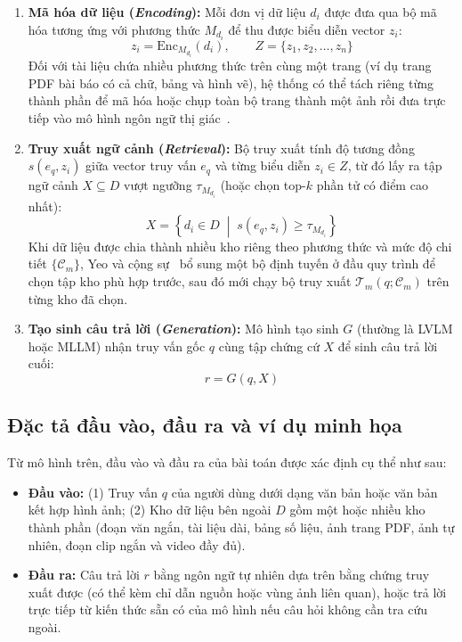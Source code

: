 \begin{enumerate}
    \item \textbf{Mã hóa dữ liệu (\textit{Encoding}):} Mỗi đơn vị dữ liệu $d_i$ được đưa qua bộ mã hóa tương ứng với phương thức $M_{d_i}$ để thu được biểu diễn vector $z_i$:
    \begin{equation}
        z_i = \mathrm{Enc}_{M_{d_i}}(d_i), \qquad Z = \{z_1, z_2, \dots, z_n\}
        \label{eq:ch1_encode}
    \end{equation}
    Đối với tài liệu chứa nhiều phương thức trên cùng một trang (ví dụ trang PDF bài báo có cả chữ, bảng và hình vẽ), hệ thống có thể tách riêng từng thành phần để mã hóa hoặc chụp toàn bộ trang thành một ảnh rồi đưa trực tiếp vào mô hình ngôn ngữ thị giác~\cite{abootorabi2025ask,faysse2025colpali,yu2025visrag}.

    \item \textbf{Truy xuất ngữ cảnh (\textit{Retrieval}):} Bộ truy xuất tính độ tương đồng $s(e_q, z_i)$ giữa vector truy vấn $e_q$ và từng biểu diễn $z_i \in Z$, từ đó lấy ra tập ngữ cảnh $X \subseteq D$ vượt ngưỡng $\tau_{M_{d_i}}$ (hoặc chọn top-$k$ phần tử có điểm cao nhất):
    \begin{equation}
        X = \left\{ d_i \in D \;\middle|\; s(e_q, z_i) \ge \tau_{M_{d_i}} \right\}
        \label{eq:ch1_retrieve}
    \end{equation}
    Khi dữ liệu được chia thành nhiều kho riêng theo phương thức và mức độ chi tiết $\{\mathcal{C}_m\}$, Yeo và cộng sự~\cite{yeo2026universalrag} bổ sung một bộ định tuyến ở đầu quy trình để chọn tập kho phù hợp trước, sau đó mới chạy bộ truy xuất $\mathcal{T}_m(q; \mathcal{C}_m)$ trên từng kho đã chọn.

    \item \textbf{Tạo sinh câu trả lời (\textit{Generation}):} Mô hình tạo sinh $G$ (thường là LVLM hoặc MLLM) nhận truy vấn gốc $q$ cùng tập chứng cứ $X$ để sinh câu trả lời cuối:
    \begin{equation}
        r = G(q, X)
        \label{eq:ch1_generate}
    \end{equation}
\end{enumerate}

\subsection{Đặc tả đầu vào, đầu ra và ví dụ minh họa}

Từ mô hình trên, đầu vào và đầu ra của bài toán được xác định cụ thể như sau:
\begin{itemize}
    \item \textbf{Đầu vào:} (1) Truy vấn $q$ của người dùng dưới dạng văn bản hoặc văn bản kết hợp hình ảnh; (2) Kho dữ liệu bên ngoài $D$ gồm một hoặc nhiều kho thành phần (đoạn văn ngắn, tài liệu dài, bảng số liệu, ảnh trang PDF, ảnh tự nhiên, đoạn clip ngắn và video đầy đủ).
    \item \textbf{Đầu ra:} Câu trả lời $r$ bằng ngôn ngữ tự nhiên dựa trên bằng chứng truy xuất được (có thể kèm chỉ dẫn nguồn hoặc vùng ảnh liên quan), hoặc trả lời trực tiếp từ kiến thức sẵn có của mô hình nếu câu hỏi không cần tra cứu ngoài.
\end{itemize}

